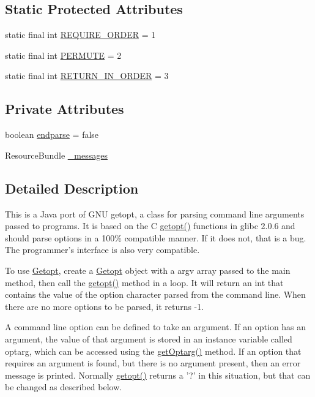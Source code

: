 \subsection*{Static Protected Attributes}
\begin{DoxyCompactItemize}
\item 
static final int \hyperlink{classgnu_1_1getopt_1_1_getopt_a565d6f6705e2d2d1273ee1d5880a0073}{REQUIRE\_\-ORDER} = 1
\item 
static final int \hyperlink{classgnu_1_1getopt_1_1_getopt_a40d611d25b27cb29cc6f3791882652ab}{PERMUTE} = 2
\item 
static final int \hyperlink{classgnu_1_1getopt_1_1_getopt_a1c175740e7a8b309f46ac10259eeea11}{RETURN\_\-IN\_\-ORDER} = 3
\end{DoxyCompactItemize}
\subsection*{Private Attributes}
\begin{DoxyCompactItemize}
\item 
boolean \hyperlink{classgnu_1_1getopt_1_1_getopt_a852cfaf9571de753256f2edd920c6abc}{endparse} = false
\item 
ResourceBundle \hyperlink{classgnu_1_1getopt_1_1_getopt_a3abb4bdca8e36a53d49f71fb1c421512}{\_\-messages}
\end{DoxyCompactItemize}


\subsection{Detailed Description}
This is a Java port of GNU getopt, a class for parsing command line arguments passed to programs. It is based on the C \hyperlink{classgnu_1_1getopt_1_1_getopt_a49e6fc6e18756f5dfaf85c1067325c3b}{getopt()} functions in glibc 2.0.6 and should parse options in a 100\% compatible manner. If it does not, that is a bug. The programmer's interface is also very compatible. 

To use \hyperlink{classgnu_1_1getopt_1_1_getopt}{Getopt}, create a \hyperlink{classgnu_1_1getopt_1_1_getopt}{Getopt} object with a argv array passed to the main method, then call the \hyperlink{classgnu_1_1getopt_1_1_getopt_a49e6fc6e18756f5dfaf85c1067325c3b}{getopt()} method in a loop. It will return an int that contains the value of the option character parsed from the command line. When there are no more options to be parsed, it returns -\/1. 

A command line option can be defined to take an argument. If an option has an argument, the value of that argument is stored in an instance variable called optarg, which can be accessed using the \hyperlink{classgnu_1_1getopt_1_1_getopt_a306e1acd3be41f5e9462f42e78a6ca93}{getOptarg()} method. If an option that requires an argument is found, but there is no argument present, then an error message is printed. Normally \hyperlink{classgnu_1_1getopt_1_1_getopt_a49e6fc6e18756f5dfaf85c1067325c3b}{getopt()} returns a '?' in this situation, but that can be changed as described below. 

